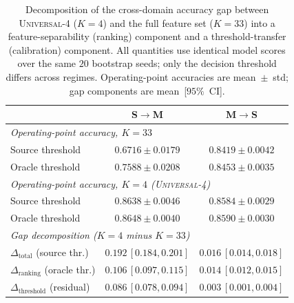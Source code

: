 \begin{table}[t]
\centering
\footnotesize
\caption{Decomposition of the cross-domain accuracy gap between
\textsc{Universal-4} ($K{=}4$) and the full feature set ($K{=}33$) into a
feature-separability (ranking) component and a threshold-transfer (calibration)
component. All quantities use identical model scores over the same $20$ bootstrap
seeds; only the decision threshold differs across regimes. Operating-point
accuracies are mean~$\pm$~std; gap components are mean~[$95\%$~CI].}
\label{tab:threshold-decomposition}
\begin{tabular}{lcc}
\toprule
 & S$\rightarrow$M & M$\rightarrow$S \\
\midrule
\multicolumn{3}{l}{\textit{Operating-point accuracy, $K=33$}}\\
\quad Source threshold & $0.6716 \pm 0.0179$ & $0.8419 \pm 0.0042$ \\
\quad Oracle threshold & $0.7588 \pm 0.0208$ & $0.8453 \pm 0.0035$ \\
\midrule
\multicolumn{3}{l}{\textit{Operating-point accuracy, $K=4$ (\textsc{Universal-4})}}\\
\quad Source threshold & $0.8638 \pm 0.0046$ & $0.8584 \pm 0.0029$ \\
\quad Oracle threshold & $0.8648 \pm 0.0040$ & $0.8590 \pm 0.0030$ \\
\midrule
\multicolumn{3}{l}{\textit{Gap decomposition ($K{=}4$ minus $K{=}33$)}}\\
\quad $\Delta_{\text{total}}$ (source thr.)   & $0.192\,[0.184,0.201]$ & $0.016\,[0.014,0.018]$ \\
\quad $\Delta_{\text{ranking}}$ (oracle thr.) & $0.106\,[0.097,0.115]$ & $0.014\,[0.012,0.015]$ \\
\quad $\Delta_{\text{threshold}}$ (residual)  & $0.086\,[0.078,0.094]$ & $0.003\,[0.001,0.004]$ \\
\bottomrule
\end{tabular}
\end{table}


%

